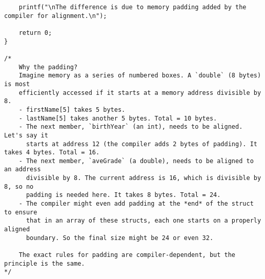 \documentclass[11pt]{book}
\begin{document}
\begin{verbatim}
    printf("\nThe difference is due to memory padding added by the compiler for alignment.\n");

    return 0;
}

/*
    Why the padding?
    Imagine memory as a series of numbered boxes. A `double` (8 bytes) is most
    efficiently accessed if it starts at a memory address divisible by 8.
    - firstName[5] takes 5 bytes.
    - lastName[5] takes another 5 bytes. Total = 10 bytes.
    - The next member, `birthYear` (an int), needs to be aligned. Let's say it
      starts at address 12 (the compiler adds 2 bytes of padding). It takes 4 bytes. Total = 16.
    - The next member, `aveGrade` (a double), needs to be aligned to an address
      divisible by 8. The current address is 16, which is divisible by 8, so no
      padding is needed here. It takes 8 bytes. Total = 24.
    - The compiler might even add padding at the *end* of the struct to ensure
      that in an array of these structs, each one starts on a properly aligned
      boundary. So the final size might be 24 or even 32.

    The exact rules for padding are compiler-dependent, but the principle is the same.
*/

\end{verbatim}
\clearpage
\end{document}
